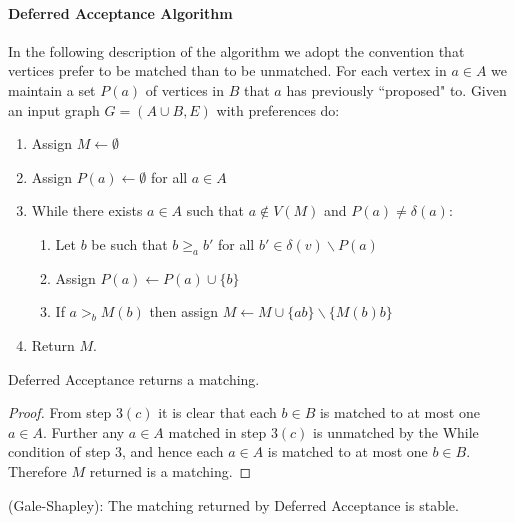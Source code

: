 \paragraph{Deferred Acceptance Algorithm}
In the following description of the algorithm we adopt the convention that vertices prefer to be matched than to be unmatched. For each vertex in $a\in A$ we maintain a set $P(a)$ of vertices in $B$ that $a$ has previously ``proposed" to. Given an input graph $G=(A \cup B, E)$ with preferences do:
\begin{enumerate}
\item Assign $M \leftarrow \emptyset$
\item Assign $P(a) \leftarrow \emptyset$ for all $a \in A$
\item While there exists $a \in A$ such that $a \not\in V(M)$ and $P(a) \neq \delta(a)$:
	\begin{enumerate}
	\item Let $b$ be such that $b \geq_a b'$ for all $b' \in \delta(v) \backslash P(a)$
	\item Assign $P(a) \leftarrow P(a) \cup \{b\}$
	\item If $a >_b M(b)$ then assign $M \leftarrow M \cup \{ab\} \backslash \{M(b)b\}$
	\end{enumerate}
\item Return $M$.
\end{enumerate}
\begin{lemma} Deferred Acceptance returns a matching.
\end{lemma}
\begin{proof}
From step $3(c)$ it is clear that each $b \in B$ is matched to at most one $a \in A$. Further any $a \in A$ matched in step $3(c)$ is unmatched by the While condition of step $3$, and hence each $a \in A$ is matched to at most one $b \in B$. Therefore $M$ returned is a matching. \end{proof}
\begin{theorem}(Gale-Shapley): The matching returned by Deferred Acceptance is stable.
\end{theorem}
